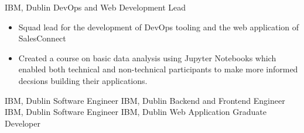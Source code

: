 {IBM, Dublin}
{DevOps and Web Development \newline
	Lead}
{\begin{itemize}
		\item Squad lead for the development of DevOps tooling and the web application of SalesConnect
		\item Created a course on basic data analysis using Jupyter Notebooks which enabled both technical and non-technical participants to make more informed decsions building their applications.
	\end{itemize}}
{IBM, Dublin}
{Software Engineer}
{}
{IBM, Dublin}
{Backend and Frontend Engineer}
{}
{IBM, Dublin}
{Software Engineer}
{}
{IBM, Dublin}
{Web Application Graduate \newline
	Developer}
{}